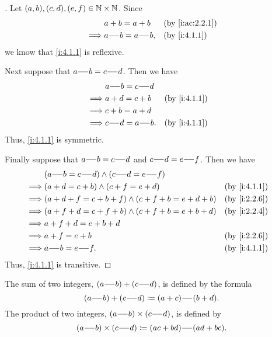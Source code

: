 \begin{proof}[]
  Let \((a, b), (c, d), (e, f) \in \mathbb{N} \times \mathbb{N}\).
  Since
  \begin{align*}
             & a + b = a + b      &  & \by{i:ac:2.2.1} \\
    \implies & a \mm b = a \mm b, &  & \by{i:4.1.1}
  \end{align*}
  we know that \cref{i:4.1.1} is reflexive.

  Next suppose that \(a {-}\!{-} b = c {-}\!{-} d\).
  Then we have
  \begin{align*}
             & a \mm b = c \mm d                    \\
    \implies & a + d = c + b      &  & \by{i:4.1.1} \\
    \implies & c + b = a + d                        \\
    \implies & c \mm d = a \mm b. &  & \by{i:4.1.1}
  \end{align*}
  Thus, \cref{i:4.1.1} is symmetric.

  Finally suppose that \(a {-}\!{-} b = c {-}\!{-} d\) and \(c {-}\!{-} d = e {-}\!{-} f\).
  Then we have
  \begin{align*}
             & (a \mm b = c \mm d) \land (c \mm d = e \mm f)                           \\
    \implies & (a + d = c + b) \land (c + f = e + d)                 &  & \by{i:4.1.1} \\
    \implies & (a + d + f = c + b + f) \land (c + f + b = e + d + b) &  & \by{i:2.2.6} \\
    \implies & (a + f + d = c + f + b) \land (c + f + b = e + b + d) &  & \by{i:2.2.4} \\
    \implies & a + f + d = e + b + d                                                   \\
    \implies & a + f = e + b                                         &  & \by{i:2.2.6} \\
    \implies & a \mm b = e \mm f.                                    &  & \by{i:4.1.1}
  \end{align*}
  Thus, \cref{i:4.1.1} is transitive.
\end{proof}

\begin{defn}\label{i:4.1.2}
  The sum of two integers, \((a {-}\!{-} b) + (c {-}\!{-} d)\), is defined by the formula
  \[
    (a {-}\!{-} b) + (c {-}\!{-} d) \coloneqq (a + c) {-}\!{-} (b + d).
  \]
  The product of two integers, \((a {-}\!{-} b) \times (c {-}\!{-} d)\), is defined by
  \[
    (a {-}\!{-} b) \times (c {-}\!{-} d) \coloneqq (ac + bd) {-}\!{-} (ad + bc).
  \]
\end{defn}

